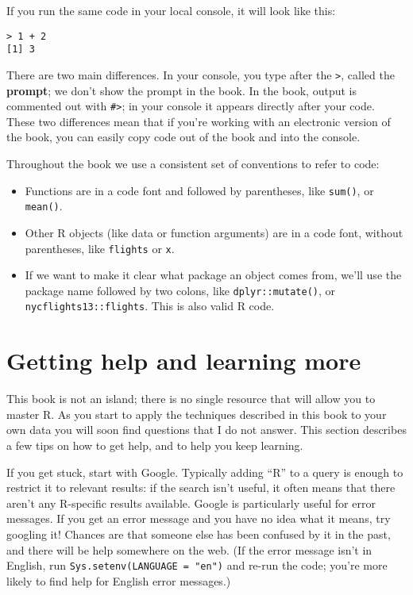 \documentclass[]{book}
\begin{document}
If you run the same code in your local console, it will look like this:

\begin{verbatim}
> 1 + 2
[1] 3
\end{verbatim}

There are two main differences. In your console, you type after the
\texttt{\textgreater{}}, called the \textbf{prompt}; we don't show the
prompt in the book. In the book, output is commented out with
\texttt{\#\textgreater{}}; in your console it appears directly after
your code. These two differences mean that if you're working with an
electronic version of the book, you can easily copy code out of the book
and into the console.

Throughout the book we use a consistent set of conventions to refer to
code:

\begin{itemize}
\item
  Functions are in a code font and followed by parentheses, like
  \texttt{sum()}, or \texttt{mean()}.
\item
  Other R objects (like data or function arguments) are in a code font,
  without parentheses, like \texttt{flights} or \texttt{x}.
\item
  If we want to make it clear what package an object comes from, we'll
  use the package name followed by two colons, like
  \texttt{dplyr::mutate()}, or\\
  \texttt{nycflights13::flights}. This is also valid R code.
\end{itemize}

\section{Getting help and learning
more}\label{getting-help-and-learning-more}

This book is not an island; there is no single resource that will allow
you to master R. As you start to apply the techniques described in this
book to your own data you will soon find questions that I do not answer.
This section describes a few tips on how to get help, and to help you
keep learning.

If you get stuck, start with Google. Typically adding ``R'' to a query
is enough to restrict it to relevant results: if the search isn't
useful, it often means that there aren't any R-specific results
available. Google is particularly useful for error messages. If you get
an error message and you have no idea what it means, try googling it!
Chances are that someone else has been confused by it in the past, and
there will be help somewhere on the web. (If the error message isn't in
English, run \texttt{Sys.setenv(LANGUAGE\ =\ "en")} and re-run the code;
you're more likely to find help for English error messages.)
\end{document}
